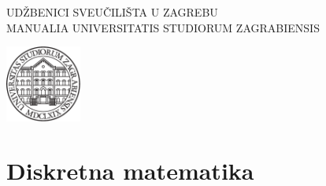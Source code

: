 \documentclass[
11pt,
twoside,
]{hrbook}
\begin{document}
\setlength{\unitlength}{0.17mm}



\frontmatter

\thispagestyle{empty}
\begin{flushright}
\MakeUppercase{Ud\v{z}benici sveu\v{c}ili\v{s}ta u Zagrebu}\\
\MakeUppercase{Manualia Universitatis Studiorum Zagrabiensis}
\end{flushright}
\vfill
\begin{flushright}
\includegraphics[width=2.5cm]{unizg}
\end{flushright}



	\newpage
	
	
	
	\newpage
	
	\maketitle
	
	\newpage







	{
	\small
	\tableofcontents
	}
	
	

	\mainmatter
		
	\part{Diskretna matematika}
	
	
	
\end{document}
